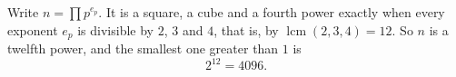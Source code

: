 Write $n=\prod p^{e_p}$. It is a square, a cube and a fourth power exactly when every exponent $e_p$ is divisible by $2$, $3$ and $4$, that is, by $\operatorname{lcm}(2,3,4)=12$. So $n$ is a twelfth power, and the smallest one greater than $1$ is
\[
2^{12}=\boxed{4096}.
\]
